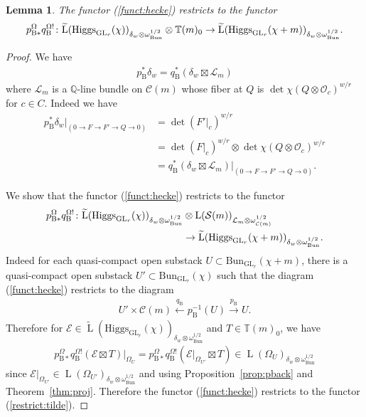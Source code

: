 \documentclass [11pt,oneside,a4paper,mathscr]{amsart}
\newtheorem{lemma}[thm]{Lemma}
\theoremstyle{definition}
\newcommand{\LL}{\operatorname{L}}
\newcommand{\GL}{\operatorname{GL}}
\newcommand{\Hig}{\mathrm{Higgs}}
\newcommand{\Bun}{\mathrm{Bun}}
\begin{document}
\begin{lemma}\label{lem:hecke}
The functor (\ref{funct:hecke}) restricts 
to the functor 
\begin{align}\notag
p_{\mathrm{B}\ast}^{\Omega} q_{\mathrm{B}}^{\Omega!} \colon 
\widetilde{\LL}(\Hig_{\GL_r}(\chi))_{\delta_w \otimes \omega_{\Bun}^{1/2}} \otimes \mathbb{T}(m)_0
\to \widetilde{\LL}(\Hig_{\GL_r}(\chi+m))_{\delta_w\otimes \omega_{\Bun}^{1/2}}.
    \end{align}
\end{lemma}
\begin{proof} 
    We have 
    \begin{align*}
        p_{\mathrm{B}}^{\ast}\delta_w =q_{\mathrm{B}}^{\ast}(\delta_w \boxtimes \mathcal{L}_m)
    \end{align*}
    where $\mathcal{L}_m$ is a $\mathbb{Q}$-line bundle on $\mathcal{C}(m)$
    whose fiber at $Q$ is $\det \chi(Q \otimes \mathcal{O}_{c})^{w/r}$ for $c\in C$. 
Indeed we have \begin{align*}p_{\mathrm{B}}^* \delta_w|_{(0 \to F \to F' \to Q \to 0)}&=
\det (F'|_{c})^{w/r}\\ &=\det (F|_{c})^{w/r} \otimes \det \chi(Q \otimes \mathcal{O}_{c})^{w/r}
\\ &=q_{\mathrm{B}}^{\ast}(\delta_w \boxtimes \mathcal{L}_m)|_{(0 \to F \to F' \to Q \to 0)}. \end{align*}
 
   We show that 
    the functor (\ref{funct:hecke}) restricts to the functor 
    \begin{align}\notag
p_{\mathrm{B}\ast}^{\Omega} q_{\mathrm{B}}^{\Omega!} \colon 
\widetilde{\LL}(\Hig_{\GL_r}(\chi))_{\delta_w \otimes \omega_{\Bun}^{1/2}} &\otimes \LL(\mathcal{S}(m))_{\mathcal{L}_m \otimes \omega_{\mathcal{C}(m)}^{1/2}} \\ \label{restrict:tilde}
&\to \widetilde{\LL}(\Hig_{\GL_r}(\chi+m))_{\delta_w\otimes \omega_{\Bun}^{1/2}}.
    \end{align}
Indeed for each quasi-compact open substack $U\subset \Bun_{\GL_r}(\chi+m)$, 
there is a quasi-compact open substack $U'\subset \Bun_{\GL_r}(\chi)$ such that 
the diagram (\ref{funct:hecke}) restricts to the diagram 
\begin{align*}
    U' \times \mathcal{C}(m) \stackrel{q_{\mathrm{B}}^{}}{\leftarrow} p_{\mathrm{B}}^{-1}(U) \stackrel{p_{\mathrm{B}}^{}}{\to} U.
\end{align*}
Therefore for $\mathcal{E}\in \widetilde{\LL}(\Hig_{\GL_r}(\chi))_{\delta_w \otimes \omega_{\Bun}^{1/2}}$ and $T\in \mathbb{T}(m)_0$, we have 
\begin{align*}
    p_{\mathrm{B}\ast}^{\Omega} q_{\mathrm{B}}^{\Omega!}(\mathcal{E}\boxtimes T)|_{\Omega_{U}}=p_{\mathrm{B}\ast}^{\Omega} q_{\mathrm{B}}^{\Omega!}(\mathcal{E}|_{\Omega_{U'}}\boxtimes T) \in 
    \LL(\Omega_{U})_{\delta_w \otimes \omega_{\Bun}^{1/2}}
\end{align*}
since $\mathcal{E}|_{\Omega_{U'}} \in \LL(\Omega_{U'})_{\delta_w \otimes \omega_{\Bun}^{1/2}}$
and using Proposition~\ref{prop:pback} and Theorem~\ref{thm:proj}. 
Therefore the functor (\ref{funct:hecke}) restricts to the functor (\ref{restrict:tilde}). 
    

\end{proof}
\end{document}
